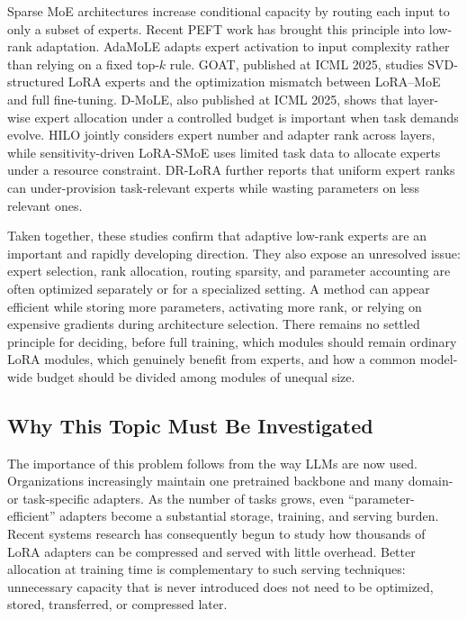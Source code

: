 \documentclass{article}
\begin{document}
Sparse MoE architectures increase conditional capacity by routing each input to only a subset of experts\cite{SPARSEMOE,HYPERROUTER,DEEPSEEKV3}. Recent PEFT work has brought this principle into low-rank adaptation. AdaMoLE adapts expert activation to input complexity rather than relying on a fixed top-$k$ rule\cite{ADAMOLE}. GOAT, published at ICML 2025, studies SVD-structured LoRA experts and the optimization mismatch between LoRA--MoE and full fine-tuning\cite{GOAT}. D-MoLE, also published at ICML 2025, shows that layer-wise expert allocation under a controlled budget is important when task demands evolve\cite{DMOLE}. HILO jointly considers expert number and adapter rank across layers\cite{HILO}, while sensitivity-driven LoRA-SMoE uses limited task data to allocate experts under a resource constraint\cite{LORASMOE}. DR-LoRA further reports that uniform expert ranks can under-provision task-relevant experts while wasting parameters on less relevant ones\cite{DRLORA}.

Taken together, these studies confirm that adaptive low-rank experts are an important and rapidly developing direction. They also expose an unresolved issue: expert selection, rank allocation, routing sparsity, and parameter accounting are often optimized separately or for a specialized setting. A method can appear efficient while storing more parameters, activating more rank, or relying on expensive gradients during architecture selection. There remains no settled principle for deciding, before full training, which modules should remain ordinary LoRA modules, which genuinely benefit from experts, and how a common model-wide budget should be divided among modules of unequal size.

\subsection{Why This Topic Must Be Investigated}

The importance of this problem follows from the way LLMs are now used. Organizations increasingly maintain one pretrained backbone and many domain- or task-specific adapters. As the number of tasks grows, even ``parameter-efficient'' adapters become a substantial storage, training, and serving burden. Recent systems research has consequently begun to study how thousands of LoRA adapters can be compressed and served with little overhead\cite{COMPRESSLORA}. Better allocation at training time is complementary to such serving techniques: unnecessary capacity that is never introduced does not need to be optimized, stored, transferred, or compressed later.
\end{document}
